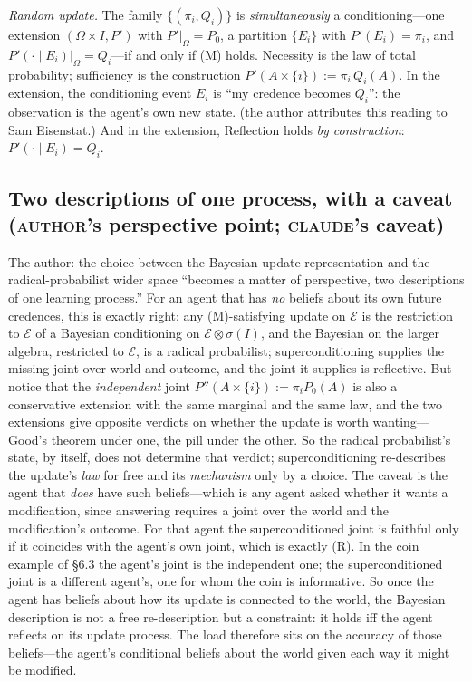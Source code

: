 \documentclass[11pt,a4paper]{article}
\newcommand{\cE}{\mathcal{E}}
\newcommand{\AUTHOR}{\textnormal{\scshape author}}
\newcommand{\CLAUDE}{\textnormal{\scshape claude}}
\begin{document}
\emph{Random update.} The family $\{(\pi_i, Q_i)\}$ is \emph{simultaneously} a conditioning---one extension $(\Omega \times I, P')$ with $P'|_\Omega = P_0$, a partition $\{E_i\}$ with $P'(E_i) = \pi_i$, and $P'(\cdot \mid E_i)|_\Omega = Q_i$---if and only if (M) holds. Necessity is the law of total probability; sufficiency is the construction $P'(A \times \{i\}) := \pi_i\,Q_i(A)$. In the extension, the conditioning event $E_i$ is ``my credence becomes $Q_i$'': the observation is the agent's own new state. (the author attributes this reading to Sam Eisenstat.) And in the extension, Reflection holds \emph{by construction}: $P'(\cdot \mid E_i) = Q_i$.

\subsection{Two descriptions of one process, with a caveat (\AUTHOR's perspective point; \CLAUDE's caveat)}
The author: the choice between the Bayesian-update representation and the radical-probabilist wider space ``becomes a matter of perspective, two descriptions of one learning process.'' For an agent that has \emph{no} beliefs about its own future credences, this is exactly right: any (M)-satisfying update on $\cE$ is the restriction to $\cE$ of a Bayesian conditioning on $\cE \otimes \sigma(I)$, and the Bayesian on the larger algebra, restricted to $\cE$, is a radical probabilist; superconditioning supplies the missing joint over world and outcome, and the joint it supplies is reflective. But notice that the \emph{independent} joint $P''(A \times \{i\}) := \pi_i P_0(A)$ is also a conservative extension with the same marginal and the same law, and the two extensions give opposite verdicts on whether the update is worth wanting---Good's theorem under one, the pill under the other. So the radical probabilist's state, by itself, does not determine that verdict; superconditioning re-describes the update's \emph{law} for free and its \emph{mechanism} only by a choice. The caveat is the agent that \emph{does} have such beliefs---which is any agent asked whether it wants a modification, since answering requires a joint over the world and the modification's outcome. For that agent the superconditioned joint is faithful only if it coincides with the agent's own joint, which is exactly (R). In the coin example of \S6.3 the agent's joint is the independent one; the superconditioned joint is a different agent's, one for whom the coin is informative. So once the agent has beliefs about how its update is connected to the world, the Bayesian description is not a free re-description but a constraint: it holds iff the agent reflects on its update process. The load therefore sits on the accuracy of those beliefs---the agent's conditional beliefs about the world given each way it might be modified.
\end{document}
